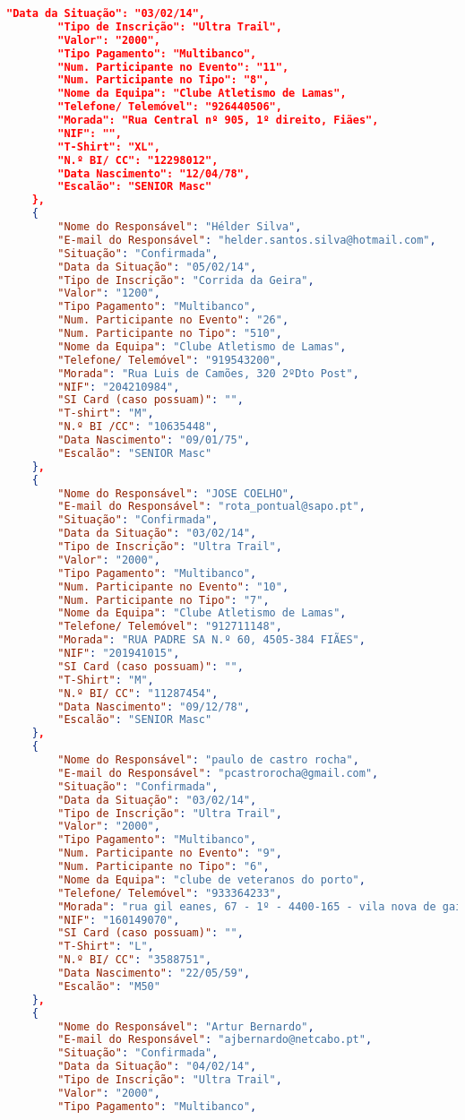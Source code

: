 \documentclass[11pt,a4paper]{report}
\begin{document}
\begin{lstlisting}[language=json,firstnumber=1]
		"Data da Situação": "03/02/14",
		"Tipo de Inscrição": "Ultra Trail",
		"Valor": "2000",
		"Tipo Pagamento": "Multibanco",
		"Num. Participante no Evento": "11",
		"Num. Participante no Tipo": "8",
		"Nome da Equipa": "Clube Atletismo de Lamas",
		"Telefone/ Telemóvel": "926440506",
		"Morada": "Rua Central nº 905, 1º direito, Fiães",
		"NIF": "",
		"T-Shirt": "XL",
		"N.º BI/ CC": "12298012",
		"Data Nascimento": "12/04/78",
		"Escalão": "SENIOR Masc"
	},
	{
		"Nome do Responsável": "Hélder Silva",
		"E-mail do Responsável": "helder.santos.silva@hotmail.com",
		"Situação": "Confirmada",
		"Data da Situação": "05/02/14",
		"Tipo de Inscrição": "Corrida da Geira",
		"Valor": "1200",
		"Tipo Pagamento": "Multibanco",
		"Num. Participante no Evento": "26",
		"Num. Participante no Tipo": "510",
		"Nome da Equipa": "Clube Atletismo de Lamas",
		"Telefone/ Telemóvel": "919543200",
		"Morada": "Rua Luis de Camões, 320 2ºDto Post",
		"NIF": "204210984",
		"SI Card (caso possuam)": "",
		"T-shirt": "M",
		"N.º BI /CC": "10635448",
		"Data Nascimento": "09/01/75",
		"Escalão": "SENIOR Masc"
	},
	{
		"Nome do Responsável": "JOSE COELHO",
		"E-mail do Responsável": "rota_pontual@sapo.pt",
		"Situação": "Confirmada",
		"Data da Situação": "03/02/14",
		"Tipo de Inscrição": "Ultra Trail",
		"Valor": "2000",
		"Tipo Pagamento": "Multibanco",
		"Num. Participante no Evento": "10",
		"Num. Participante no Tipo": "7",
		"Nome da Equipa": "Clube Atletismo de Lamas",
		"Telefone/ Telemóvel": "912711148",
		"Morada": "RUA PADRE SA N.º 60, 4505-384 FIÃES",
		"NIF": "201941015",
		"SI Card (caso possuam)": "",
		"T-Shirt": "M",
		"N.º BI/ CC": "11287454",
		"Data Nascimento": "09/12/78",
		"Escalão": "SENIOR Masc"
	},
	{
		"Nome do Responsável": "paulo de castro rocha",
		"E-mail do Responsável": "pcastrorocha@gmail.com",
		"Situação": "Confirmada",
		"Data da Situação": "03/02/14",
		"Tipo de Inscrição": "Ultra Trail",
		"Valor": "2000",
		"Tipo Pagamento": "Multibanco",
		"Num. Participante no Evento": "9",
		"Num. Participante no Tipo": "6",
		"Nome da Equipa": "clube de veteranos do porto",
		"Telefone/ Telemóvel": "933364233",
		"Morada": "rua gil eanes, 67 - 1º - 4400-165 - vila nova de gaia",
		"NIF": "160149070",
		"SI Card (caso possuam)": "",
		"T-Shirt": "L",
		"N.º BI/ CC": "3588751",
		"Data Nascimento": "22/05/59",
		"Escalão": "M50"
	},
	{
		"Nome do Responsável": "Artur Bernardo",
		"E-mail do Responsável": "ajbernardo@netcabo.pt",
		"Situação": "Confirmada",
		"Data da Situação": "04/02/14",
		"Tipo de Inscrição": "Ultra Trail",
		"Valor": "2000",
		"Tipo Pagamento": "Multibanco",

\end{lstlisting}
\end{document}

